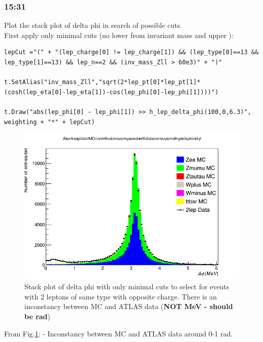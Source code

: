 \subsubsection*{15:31}
Plot the stack plot of delta phi in search of possible cuts.
\\
First apply only minimal cuts (no lower from invariant mass and upper ):
\begin{lstlisting}
lepCut ="(" + "(lep_charge[0] != lep_charge[1]) && (lep_type[0]==13 && lep_type[1]==13) && lep_n==2 && (inv_mass_Zll > 60e3)" + ")"
    
t.SetAlias("inv_mass_Zll","sqrt(2*lep_pt[0]*lep_pt[1]*(cosh(lep_eta[0]-lep_eta[1])-cos(lep_phi[0]-lep_phi[1])))")

t.Draw("abs(lep_phi[0] - lep_phi[1]) >> h_lep_delta_phi(100,0,6.3)", weighting + "*" + lepCut)
\end{lstlisting}
\begin{figure}[h!]
    \centering
	\includegraphics[width=0.85\linewidth]{plots/23-02-2021/All-stack-fast_delta-phi_minimal-cuts_0-6_23-02-21_15-30.png}
	\caption{Stack plot of delta phi with only minimal cuts to select for events with 2 leptons of same type with opposite charge.  There is an inconstancy between MC and ATLAS data (\textbf{NOT MeV - should be rad})}\label{fig:All-stack-fast_delta-phi_minimal-cuts_0-6_23-02-21_15-30}
\end{figure}
From Fig.\ref{fig:All-stack-fast_delta-phi_minimal-cuts_0-6_23-02-21_15-30}:
- Inconstancy between MC and ATLAS data around 0-1 rad.

